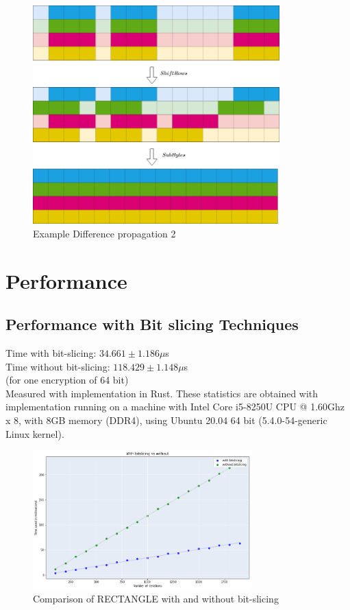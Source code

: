 \documentclass[final]{transcrypto}
\begin{document}
\begin{figure}[H]
\caption{Example Difference propagation 2}
\centering
\includegraphics[width=0.85\textwidth]{images/diff_prop2_xor.png}
\end{figure}
\newpage
\section{Performance}
\subsection{Performance with Bit slicing Techniques}
\label{Soft}
Time with bit-slicing: $34.661\pm 1.186\mu $s\\
Time without bit-slicing: $118.429\pm 1.148 \mu $s\\
(for one encryption of 64 bit)\\
Measured with implementation in Rust. These statistics are obtained with implementation running on a machine with Intel Core i5-8250U CPU @ 1.60Ghz x 8, with 8GB memory (DDR4), using Ubuntu 20.04 64 bit (5.4.0-54-generic Linux kernel).
\begin{figure}[H]
\caption{Comparison of RECTANGLE with and without bit-slicing}
\centering
\includegraphics[width=0.75\textwidth]{images/bitslicing_graph_small.png}
\end{figure}
\end{document}
